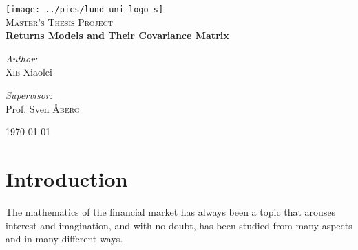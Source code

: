 \documentclass{report}
\author{Xie Xiaolei}
\date{\today}
\begin{document}
\begin{titlepage}
\begin{center}

\texttt{[image: ../pics/lund\_uni-logo\_s]}~\\[1cm]


\textsc{\Large Master's Thesis Project}\\[0.5cm]

{ \huge \bfseries Returns Models and Their Covariance Matrix
  \\[0.4cm] }


\begin{minipage}{0.4\textwidth}
\begin{flushleft} \large
\emph{Author:}\\
\textsc{Xie} Xiaolei
\end{flushleft}
\end{minipage}
\begin{minipage}{0.4\textwidth}
\begin{flushright} \large
\emph{Supervisor:} \\
Prof. Sven \textsc{\AA berg}
\end{flushright}
\end{minipage}

\vfill

{\large \today}

\end{center}
\end{titlepage}
\tableofcontents

\chapter{Introduction}
The mathematics of the financial market has always been a topic that
arouses interest and imagination, and with no doubt, has been
studied from many aspects and in many different ways.
\end{document}
